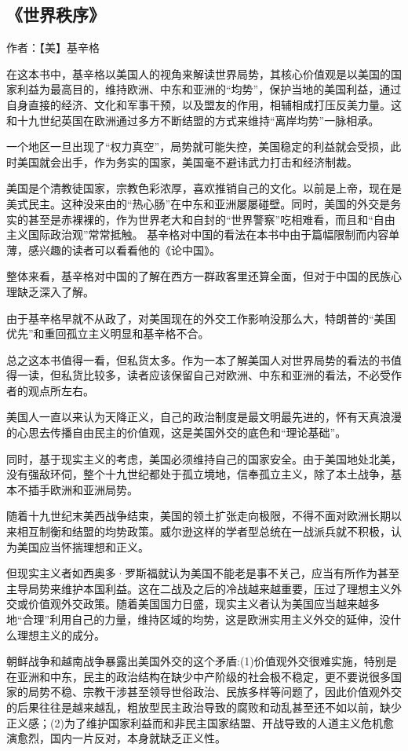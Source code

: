 \subsection{《世界秩序》}

作者：【美】基辛格

在这本书中，基辛格以美国人的视角来解读世界局势，其核心价值观是以美国的国家利益为最高目的，维持欧洲、中东和亚洲的“均势”，保护当地的美国利益，通过自身直接的经济、文化和军事干预，以及盟友的作用，相辅相成打压反美力量。这和十九世纪英国在欧洲通过多方不断结盟的方式来维持“离岸均势”一脉相承。

一个地区一旦出现了“权力真空”，局势就可能失控，美国稳定的利益就会受损，此时美国就会出手，作为务实的国家，美国毫不避讳武力打击和经济制裁。

美国是个清教徒国家，宗教色彩浓厚，喜欢推销自己的文化。以前是上帝，现在是美式民主。这种没来由的“热心肠”在中东和亚洲屡屡碰壁。同时，美国的外交是务实的甚至是赤裸裸的，作为世界老大和自封的“世界警察”吃相难看，而且和“自由主义国际政治观”常常抵触。
基辛格对中国的看法在本书中由于篇幅限制而内容单薄，感兴趣的读者可以看看他的《论中国》。

整体来看，基辛格对中国的了解在西方一群政客里还算全面，但对于中国的民族心理缺乏深入了解。

由于基辛格早就不从政了，对美国现在的外交工作影响没那么大，特朗普的“美国优先”和重回孤立主义明显和基辛格不合。

总之这本书值得一看，但私货太多。作为一本了解美国人对世界局势的看法的书值得一读，但私货比较多，读者应该保留自己对欧洲、中东和亚洲的看法，不必受作者的观点所左右。

美国人一直以来认为天降正义，自己的政治制度是最文明最先进的，怀有天真浪漫的心思去传播自由民主的价值观，这是美国外交的底色和“理论基础”。

同时，基于现实主义的考虑，美国必须维持自己的国家安全。由于美国地处北美，没有强敌环伺，整个十九世纪都处于孤立境地，信奉孤立主义，除了本土战争，基本不插手欧洲和亚洲局势。

随着十九世纪末美西战争结束，美国的领土扩张走向极限，不得不面对欧洲长期以来相互制衡和结盟的均势政策。威尔逊这样的学者型总统在一战派兵就不积极，认为美国应当怀揣理想和正义。

但现实主义者如西奥多·罗斯福就认为美国不能老是事不关己，应当有所作为甚至主导局势来维护本国利益。这在二战及之后的冷战越来越重要，压过了理想主义外交或价值观外交政策。随着美国国力日盛，现实主义者认为美国应当越来越多地“合理”利用自己的力量，维持区域的均势，这是欧洲实用主义外交的延伸，没什么理想主义的成分。

朝鲜战争和越南战争暴露出美国外交的这个矛盾:(1)价值观外交很难实施，特别是在亚洲和中东，民主的政治结构在缺少中产阶级的社会极不稳定，更不要说很多国家的局势不稳、宗教干涉甚至领导世俗政治、民族多样等问题了，因此价值观外交的后果往往是越来越乱，粗放型民主政治导致的腐败和动乱甚至还不如以前，缺少正义感；(2)为了维护国家利益而和非民主国家结盟、开战导致的人道主义危机愈演愈烈，国内一片反对，本身就缺乏正义性。


